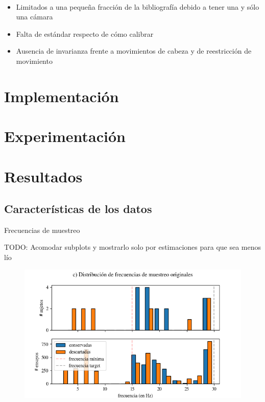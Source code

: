 \documentclass[aspectratio=169]{beamer}
\begin{document}
\begin{frame}{~}
  \begin{itemize}
    \item Limitados a una pequeña fracción de la bibliografía debido a tener
      una y sólo una cámara
    
    \item Falta de estándar respecto de cómo calibrar

    \item Ausencia de invarianza frente a movimientos de cabeza y de
      reestricción de movimiento
  \end{itemize}
\end{frame}

\section{Implementación}

\section{Experimentación}

\section{Resultados}

\subsection{Características de los datos}

\begin{frame}{Frecuencias de muestreo}

  TODO: Acomodar subplots y mostrarlo solo por estimaciones para que sea menos
  lío
  \begin{figure}
    \includegraphics[width=0.7\linewidth]{img/second-sampling-frequencies-distribution.png}
  \end{figure}

\end{frame}
\end{document}
